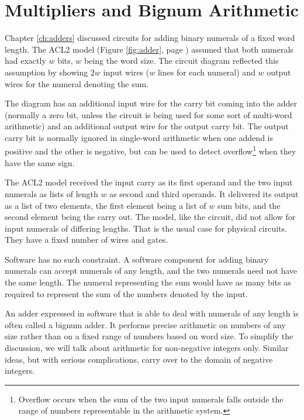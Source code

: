 \chapter{Multipliers and Bignum Arithmetic}
\label{ch:multipliers}


Chapter \ref{ch:adders} discussed circuits for adding binary numerals of a
fixed word length.
The ACL2 model (Figure \ref{fig:adder}, page \pageref{fig:adder})
assumed that both numerals had exactly $w$ bits, $w$ being the word size.
The circuit diagram reflected this assumption by
showing $2w$ input wires ($w$ lines for each numeral) and
$w$ output wires for the numeral denoting the sum.

The diagram has an additional input wire for the carry bit
coming into the adder (normally a zero bit, unless the circuit is being
used for some sort of multi-word arithmetic) and an additional output wire
for the output carry bit.
The output carry bit is normally ignored in single-word arithmetic
when one addend is positive and the other is negative,
but can be used to detect overflow\footnote{Overflow occurs
when the sum of the two input numerals falls outside
the range of numbers representable in the arithmetic system.}
when they have the same sign.

The ACL2 model received the input carry as its first operand
and the two input numerals as lists of length $w$ as second and third operands.
It delivered its output as a list of two elements,
the first element being a list of $w$ sum bits,
and the second element being the carry out.
The model, like the circuit, did not allow for input numerals
of differing lengths.
That is the usual case for physical circuits.
They have a fixed number of wires and gates.

Software has no such constraint.
A software component for adding binary numerals can accept
numerals of any length, and the two numerals need not have the same length.
The numeral representing the sum would have as many bits as
required to represent the sum of the numbers
denoted by the input.

An adder expressed in software that is able to deal with numerals
of
any length is often called a bignum adder.
It performs precise arithmetic on numbers of any size
rather than on a fixed range of numbers based on word size.
To simplify the discussion, we will talk about arithmetic
for non-negative integers only. Similar ideas, but
with serious complications, carry over
to the domain of negative integers.

